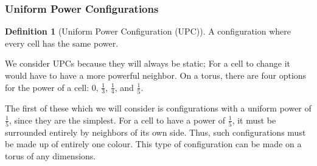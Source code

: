 \documentclass[12pt]{article}
\theoremstyle{definition}
\newtheorem{definition}{Definition}%
\theoremstyle{remark}
\theoremstyle{remark}
\begin{document}
\subsubsection{Uniform Power Configurations} \label{UPCs} %
\begin{definition}[Uniform Power Configuration (UPC)]
A configuration where every cell has the same power.
\end{definition}
\par
We consider UPCs because they will always be static; For a cell to change it would have to have a more powerful neighbor. On a torus, there are four options for the power of a cell: $0$, $\frac{1}{3}$, $\frac{1}{4}$, and $\frac{1}{5}$. %

\par
The first of these which we will consider is configurations with a uniform power of $\frac{1}{5}$, since they are the simplest. For a cell to have a power of $\frac{1}{5}$, it must be surrounded entirely by neighbors of its own side. Thus, such configurations must be made up of entirely one colour. This type of configuration can be made on a torus of any dimensions.
\end{document}
